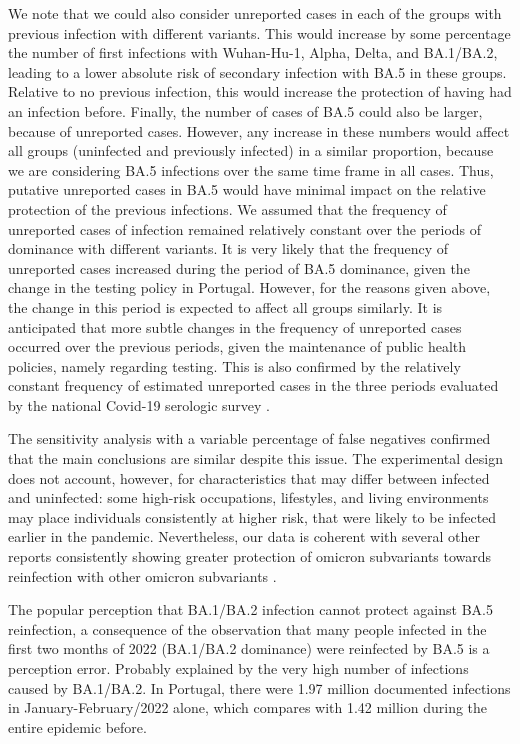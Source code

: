 We note that we could also consider unreported cases in each of the groups with previous infection with different variants. This would increase by some percentage the number of first infections with Wuhan-Hu-1, Alpha, Delta, and BA.1/BA.2, leading to a lower absolute risk of secondary infection with BA.5 in these groups. Relative to no previous infection, this would increase the protection of having had an infection before. Finally, the number of cases of BA.5 could also be larger, because of unreported cases. However, any increase in these numbers would affect all groups (uninfected and previously infected) in a similar proportion, because we are considering BA.5 infections over the same time frame in all cases. Thus, putative unreported cases in BA.5 would have minimal impact on the relative protection of the previous infections. We assumed that the frequency of unreported cases of infection remained relatively constant over the periods of dominance with different variants. It is very likely that the frequency of unreported cases increased during the period of BA.5 dominance, given the change in the testing policy in Portugal. However, for the reasons given above, the change in this period is expected to affect all groups similarly. It is anticipated that more subtle changes in the frequency of unreported cases occurred over the previous periods, given the maintenance of public health policies, namely regarding testing. This is also confirmed  by the relatively constant frequency of estimated unreported cases in the three periods evaluated by the national Covid-19 serologic survey \citep{institutonacionaldesaudedoutorricardojorge2021NationalCOVID19}.

The sensitivity analysis with a variable percentage of false negatives confirmed that the main conclusions are similar despite this issue. The experimental design does not account, however, for characteristics that may differ between infected and uninfected: some high-risk occupations, lifestyles, and living environments may place individuals consistently at higher risk, that were likely to be infected earlier in the pandemic. Nevertheless, our data is coherent with several other reports consistently showing greater protection of omicron subvariants towards reinfection with other omicron subvariants \citep{altarawneh2022ProtectionSARSCoV2, chemaitelly2022ProtectionOmicron}.

The popular perception that BA.1/BA.2 infection cannot protect against BA.5 reinfection, a consequence of the observation that many people infected in the first two months of 2022 (BA.1/BA.2 dominance) were reinfected by BA.5 is a perception error. Probably explained by the very high number of infections caused by BA.1/BA.2. In Portugal, there were 1.97 million documented infections in January-February/2022 alone, which compares with 1.42 million during the entire epidemic before. 

